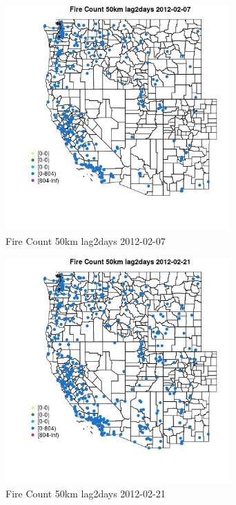 \begin{figure} 
\centering  
\includegraphics[width=0.77\textwidth]{Code_Outputs/Report_ML_input_PM25_Step4_part_f_de_duplicated_aves_prioritize_24hr_obswNAs_MapObsFire_Count_50km_lag2days2012-02-07.jpg} 
\caption{\label{fig:Report_ML_input_PM25_Step4_part_f_de_duplicated_aves_prioritize_24hr_obswNAsMapObsFire_Count_50km_lag2days2012-02-07}Fire Count 50km lag2days 2012-02-07} 
\end{figure} 
 

\begin{figure} 
\centering  
\includegraphics[width=0.77\textwidth]{Code_Outputs/Report_ML_input_PM25_Step4_part_f_de_duplicated_aves_prioritize_24hr_obswNAs_MapObsFire_Count_50km_lag2days2012-02-21.jpg} 
\caption{\label{fig:Report_ML_input_PM25_Step4_part_f_de_duplicated_aves_prioritize_24hr_obswNAsMapObsFire_Count_50km_lag2days2012-02-21}Fire Count 50km lag2days 2012-02-21} 
\end{figure} 
 

